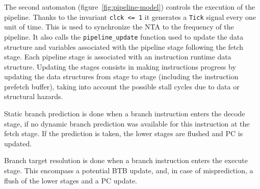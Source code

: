     The second automaton (figure~\ref{fig:pipeline-model}) controls the execution of the pipeline. 
    Thanks to the invariant \texttt{clck <= 1} it generates a \texttt{Tick}
    signal every one unit of time. This is used to synchronize the NTA to the frequency of the pipeline.
    It also calls the \texttt{pipeline\_update} function used to update the data structure and variables associated with the pipeline stage following the fetch stage.
    Each pipeline stage is associated with an instruction runtime data structure.
    Updating the stages consists in making instructions progress
    by updating the data structures from stage to stage (including the instruction prefetch buffer), taking into
    account the possible stall cycles due to data or structural hazards.

    Static branch prediction is done when a branch instruction enters the decode stage, if no dynamic branch prediction was available for this instruction at the fetch stage.
    If the prediction is taken, the lower stages are flushed and PC is updated.

    

    Branch target resolution is done when a branch instruction enters the execute stage. 
    This encompass a potential BTB update, and, in case of misprediction, a flush of the lower stages and a PC update. 





